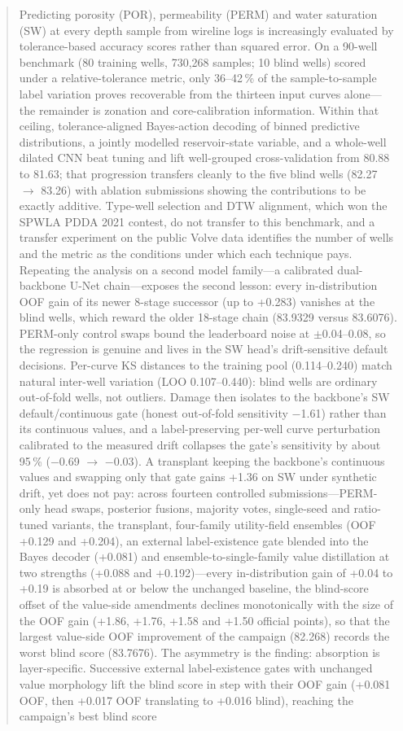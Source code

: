 \documentclass[preprint,12pt]{elsarticle}
\begin{document}
\begin{frontmatter}
\begin{abstract}
Predicting porosity (POR), permeability (PERM) and water saturation (SW) at every depth sample from wireline logs is increasingly evaluated by tolerance-based accuracy scores rather than squared error. On a 90-well benchmark (80 training wells, 730,268 samples; 10 blind wells) scored under a relative-tolerance metric, only 36--42\,\% of the sample-to-sample label variation proves recoverable from the thirteen input curves alone---the remainder is zonation and core-calibration information. Within that ceiling, tolerance-aligned Bayes-action decoding of binned predictive distributions, a jointly modelled reservoir-state variable, and a whole-well dilated CNN beat tuning and lift well-grouped cross-validation from 80.88 to 81.63; that progression transfers cleanly to the five blind wells (82.27 $\to$ 83.26) with ablation submissions showing the contributions to be exactly additive. Type-well selection and DTW alignment, which won the SPWLA PDDA 2021 contest, do not transfer to this benchmark, and a transfer experiment on the public Volve data identifies the number of wells and the metric as the conditions under which each technique pays. Repeating the analysis on a second model family---a calibrated dual-backbone U-Net chain---exposes the second lesson: every in-distribution OOF gain of its newer 8-stage successor (up to +0.283) vanishes at the blind wells, which reward the older 18-stage chain (83.9329 versus 83.6076). PERM-only control swaps bound the leaderboard noise at $\pm$0.04--0.08, so the regression is genuine and lives in the SW head's drift-sensitive default decisions. Per-curve KS distances to the training pool (0.114--0.240) match natural inter-well variation (LOO 0.107--0.440): blind wells are ordinary out-of-fold wells, not outliers. Damage then isolates to the backbone's SW default/continuous gate (honest out-of-fold sensitivity $-$1.61) rather than its continuous values, and a label-preserving per-well curve perturbation calibrated to the measured drift collapses the gate's sensitivity by about 95\,\% ($-$0.69 $\to$ $-$0.03). A transplant keeping the backbone's continuous values and swapping only that gate gains +1.36 on SW under synthetic drift, yet does not pay: across fourteen controlled submissions---PERM-only head swaps, posterior fusions, majority votes, single-seed and ratio-tuned variants, the transplant, four-family utility-field ensembles (OOF +0.129 and +0.204), an external label-existence gate blended into the Bayes decoder (+0.081) and ensemble-to-single-family value distillation at two strengths (+0.088 and +0.192)---every in-distribution gain of +0.04 to +0.19 is absorbed at or below the unchanged baseline, the blind-score offset of the value-side amendments declines monotonically with the size of the OOF gain (+1.86, +1.76, +1.58 and +1.50 official points), so that the largest value-side OOF improvement of the campaign (82.268) records the worst blind score (83.7676). The asymmetry is the finding: absorption is layer-specific. Successive external label-existence gates with unchanged value morphology lift the blind score in step with their OOF gain (+0.081 OOF, then +0.017 OOF translating to +0.016 blind), reaching the campaign's best blind score 
\end{abstract}
\end{frontmatter}
\end{document}
